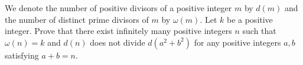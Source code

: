 We denote the number of positive divisors of a positive integer $m$ by $d(m)$ and the number of distinct prime divisors of $m$ by $\omega(m)$. Let $k$ be a positive integer. Prove that there exist infinitely many positive integers $n$ such that $\omega(n) = k$ and $d(n)$ does not divide $d(a^2+b^2)$ for any positive integers $a, b$ satisfying $a + b = n$.